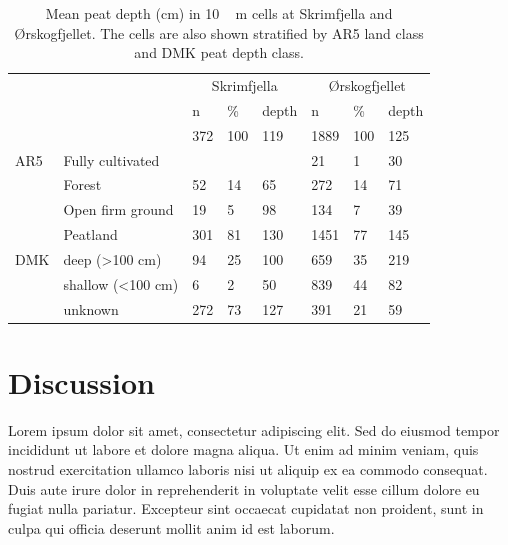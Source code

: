 \documentclass[soil, manuscript]{copernicus}
\begin{document}
\begin{table}[tbp]
\caption{Mean peat depth (cm) in \unit{10\,m} cells at Skrimfjella and Ørskogfjellet. The cells are also shown stratified by AR5 land class and DMK peat depth class.}
\begin{tabular}{llllllll}
\hline
    &                            & \multicolumn{3}{c}{Skrimfjella} & \multicolumn{3}{c}{Ørskogfjellet} \\ \cline{3-8} 
    &                            & n        & \%      & depth      & n          & \%      & depth      \\ \hline
    &                            & 372      & 100     & 119        & 1889       & 100     & 125        \\
AR5 & Fully cultivated           &          &         &            & 21         & 1       & 30         \\
    & Forest                     & 52       & 14      & 65         & 272        & 14      & 71         \\
    & Open firm ground           & 19       & 5       & 98         & 134        & 7       & 39         \\
    & Peatland                   & 301      & 81      & 130        & 1451       & 77      & 145        \\
DMK & deep (\textgreater 100 cm) & 94       & 25      & 100        & 659        & 35      & 219        \\
    & shallow (\textless 100 cm) & 6        & 2       & 50         & 839        & 44      & 82         \\
    & unknown                    & 272      & 73      & 127        & 391        & 21      & 59         \\ \hline
\end{tabular}
\label{tab:depthsByClass}
\end{table}

\section{Discussion}

Lorem ipsum dolor sit amet, consectetur adipiscing elit.
Sed do eiusmod tempor incididunt ut labore et dolore magna aliqua.
Ut enim ad minim veniam, quis nostrud exercitation ullamco laboris nisi ut aliquip ex ea commodo consequat.
Duis aute irure dolor in reprehenderit in voluptate velit esse cillum dolore eu fugiat nulla pariatur.
Excepteur sint occaecat cupidatat non proident,
sunt in culpa qui officia deserunt mollit anim id est laborum.
\end{document}
